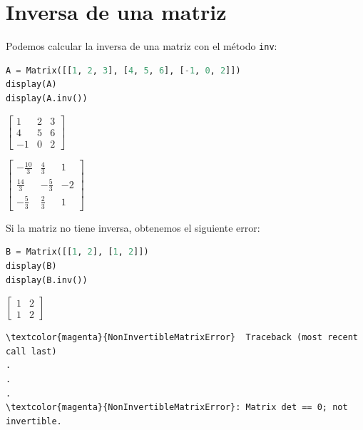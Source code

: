 \documentclass[a4,11pt]{aleph-notas}
\begin{document}
\encabezado


\section{Inversa de una matriz}

Podemos calcular la inversa de una matriz con el método \texttt{inv}:

\begin{pycodigo}
    \begin{ipynbcodigo}\begin{lstlisting}[language=Python]
A = Matrix([[1, 2, 3], [4, 5, 6], [-1, 0, 2]])
display(A)
display(A.inv())
    \end{lstlisting}\end{ipynbcodigo}
    \begin{ipynbsalida}[2mm]
$\displaystyle \left[\begin{matrix}1 & 2 & 3\\4 & 5 & 6\\-1 & 0 & 2\end{matrix}\right]$

$\displaystyle \left[\begin{matrix}- \frac{10}{3} & \frac{4}{3} & 1\\\frac{14}{3} & - \frac{5}{3} & -2\\- \frac{5}{3} & \frac{2}{3} & 1\end{matrix}\right]$
    \end{ipynbsalida}
\end{pycodigo}
    
Si la matriz no tiene inversa, obtenemos el siguiente error:
\begin{pycodigo}
    \begin{ipynbcodigo}\begin{lstlisting}[language=Python]
B = Matrix([[1, 2], [1, 2]])
display(B)
display(B.inv())
    \end{lstlisting}\end{ipynbcodigo}
    \begin{ipynbsalida}[2mm]
$\displaystyle \left[\begin{matrix}1 & 2\\1 & 2\end{matrix}\right]$

\begin{Verbatim}[commandchars=\\\{\}]
\textcolor{magenta}{NonInvertibleMatrixError}  Traceback (most recent call last)
.
.
.
\textcolor{magenta}{NonInvertibleMatrixError}: Matrix det == 0; not invertible.
    \end{Verbatim}
    \end{ipynbsalida}
\end{pycodigo}
\end{document}
